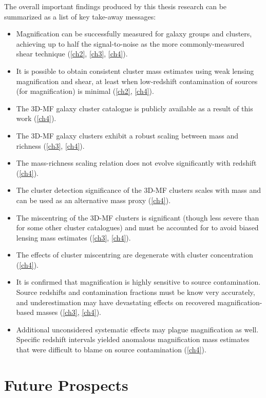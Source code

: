The overall important findings produced by this thesis research can be summarized as a list of key take-away messages:
\begin{itemize}
\item Magnification can be successfully measured for galaxy groups and clusters, achieving up to half the signal-to-noise as the more commonly-measured shear technique (\autoref{ch2}, \autoref{ch3}, \autoref{ch4}).
\item It is possible to obtain consistent cluster mass estimates using weak lensing magnification and shear, at least when low-redshift contamination of sources (for magnification) is minimal (\autoref{ch2}, \autoref{ch4}).
\item The \ac{3D-MF} galaxy cluster catalogue is publicly available as a result of this work (\autoref{ch4}).
\item The \ac{3D-MF} galaxy clusters exhibit a robust scaling between mass and richness (\autoref{ch3}, \autoref{ch4}).
\item The mass-richness scaling relation does not evolve significantly with redshift (\autoref{ch4}).
\item The cluster detection significance of the \ac{3D-MF} clusters scales with mass and can be used as an alternative mass proxy (\autoref{ch4}).
\item The miscentring of the \ac{3D-MF} clusters is significant (though less severe than for some other cluster catalogues) and must be accounted for to avoid biased lensing mass estimates (\autoref{ch3}, \autoref{ch4}).
\item The effects of cluster miscentring are degenerate with cluster concentration (\autoref{ch4}).
\item It is confirmed that magnification is highly sensitive to source contamination. Source redshifts and contamination fractions must be know very accurately, and underestimation may have devastating effects on recovered magnification-based masses (\autoref{ch3}, \autoref{ch4}).
\item Additional unconsidered systematic effects may plague magnification as well. Specific redshift intervals yielded anomalous magnification mass estimates that were difficult to blame on source contamination (\autoref{ch4}).
\end{itemize}

\section{Future Prospects}
\label{sec:future}

